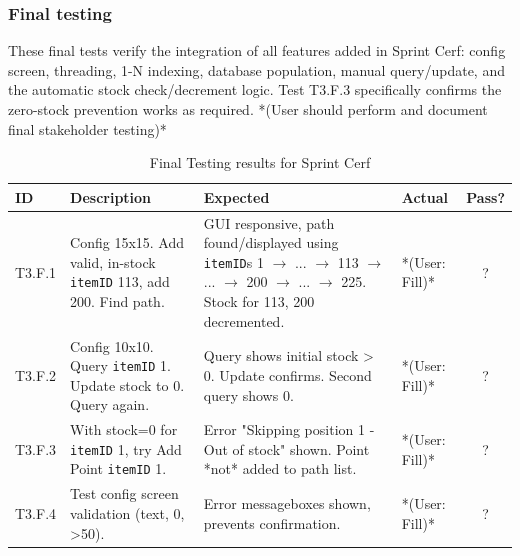 	\subsubsection{Final testing}
	These final tests verify the integration of all features added in Sprint Cerf: config screen, threading, 1-N indexing, database population, manual query/update, and the automatic stock check/decrement logic. Test T3.F.3 specifically confirms the zero-stock prevention works as required.
	*(User should perform and document final stakeholder testing)*
	
	\begin{table}[htbp] %
		\centering
		\begin{tabularx}{\textwidth}{|l|X|p{3.5cm}|p{3.5cm}|c|}
			\hline
			\textbf{ID} & \textbf{Description} & \textbf{Expected} & \textbf{Actual} & \textbf{Pass?} \\
			\hline
			T3.F.1 & Config 15x15. Add valid, in-stock \verb|itemID| 113, add 200. Find path. & GUI responsive, path found/displayed using \verb|itemID|s 1 $ \rightarrow $ ... $ \rightarrow $ 113 $ \rightarrow $ ... $ \rightarrow $ 200 $ \rightarrow $ ... $ \rightarrow $ 225. Stock for 113, 200 decremented. & *(User: Fill)* & ? \\
			\hline
			T3.F.2 & Config 10x10. Query \verb|itemID| 1. Update stock to 0. Query again. & Query shows initial stock > 0. Update confirms. Second query shows 0. & *(User: Fill)* & ? \\
			\hline
			T3.F.3 & With stock=0 for \verb|itemID| 1, try Add Point \verb|itemID| 1. & Error "Skipping position 1 - Out of stock" shown. Point *not* added to path list. & *(User: Fill)* & ? \\
			\hline
			T3.F.4 & Test config screen validation (text, 0, >50). & Error messageboxes shown, prevents confirmation. & *(User: Fill)* & ? \\
			\hline
		\end{tabularx}
		\caption{Final Testing results for Sprint Cerf}
	\end{table}
	
	\newpage
	
